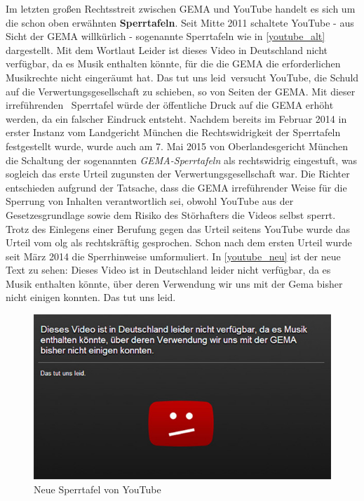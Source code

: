Im letzten großen Rechtsstreit zwischen GEMA und YouTube handelt es sich um die schon oben erwähnten \textbf{Sperrtafeln}. Seit Mitte 2011 schaltete YouTube - aus Sicht der GEMA willkürlich - sogenannte Sperrtafeln wie in \vref{youtube_alt} dargestellt. Mit dem Wortlaut \glqq Leider ist dieses Video in Deutschland nicht verfügbar, da es Musik enthalten könnte, für die die GEMA die erforderlichen Musikrechte nicht eingeräumt hat. Das tut  uns leid\grqq~versucht YouTube, die Schuld auf die Verwertungsgesellschaft zu schieben, so von Seiten der GEMA. Mit dieser \glqq irreführenden\grqq~ Sperrtafel würde der öffentliche Druck auf die GEMA erhöht werden, da ein falscher Eindruck entsteht. Nachdem bereits im Februar 2014 in erster Instanz vom Landgericht München die Rechtswidrigkeit der Sperrtafeln festgestellt wurde, wurde auch am 7. Mai 2015 von Oberlandesgericht München die Schaltung der sogenannten \textit{GEMA-Sperrtafeln} als rechtswidrig eingestuft, was sogleich das erste Urteil zugunsten der Verwertungsgesellschaft war. Die Richter entschieden aufgrund der Tatsache, dass die GEMA irreführender Weise für die Sperrung von Inhalten verantwortlich sei, obwohl YouTube aus der Gesetzesgrundlage sowie dem Risiko des Störhafters die Videos selbst sperrt. Trotz des Einlegens einer Berufung gegen das Urteil seitens YouTube wurde das Urteil vom \gls{olg} als rechtskräftig gesprochen. Schon nach dem ersten Urteil wurde seit März 2014 die Sperrhinweise umformuliert. In \vref{youtube_neu} ist der neue Text zu sehen: \glqq Dieses Video ist in Deutschland leider nicht verfügbar, da es Musik enthalten könnte, über deren Verwendung wir uns mit der Gema bisher nicht einigen konnten. Das tut uns leid.\grqq{}

\begin{figure}[H]
\centering
\includegraphics[scale=0.73]{se-wa-jpg/youtube_zeit}
\caption[Neue Sperrtafel von YouTube]{Neue Sperrtafel von YouTube\protect\footnotemark}
\label{youtube_neu}
\end{figure}

